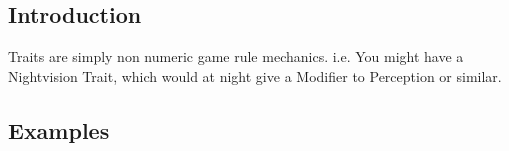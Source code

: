 
\subsection{Introduction}
\Glspl{Trait} are simply non numeric game rule mechanics. i.e.
You might have a Nightvision Trait, which would at night give a
\gls{Modifier} to Perception or similar.

\subsection{Examples}


